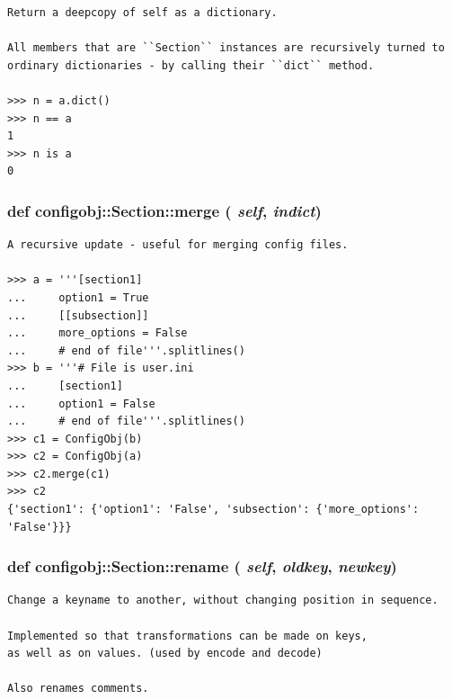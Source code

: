\footnotesize\begin{verbatim}
Return a deepcopy of self as a dictionary.

All members that are ``Section`` instances are recursively turned to
ordinary dictionaries - by calling their ``dict`` method.

>>> n = a.dict()
>>> n == a
1
>>> n is a
0
\end{verbatim}
\normalsize
\subsubsection{\setlength{\rightskip}{0pt plus 5cm}def configobj::Section::merge ( {\em self},  {\em indict})}\label{classconfigobj_1_1Section_c06d7fa9fdd69a29e78fd65a040e5cf2}




\footnotesize\begin{verbatim}
A recursive update - useful for merging config files.

>>> a = '''[section1]
...     option1 = True
...     [[subsection]]
...     more_options = False
...     # end of file'''.splitlines()
>>> b = '''# File is user.ini
...     [section1]
...     option1 = False
...     # end of file'''.splitlines()
>>> c1 = ConfigObj(b)
>>> c2 = ConfigObj(a)
>>> c2.merge(c1)
>>> c2
{'section1': {'option1': 'False', 'subsection': {'more_options': 'False'}}}
\end{verbatim}
\normalsize
\subsubsection{\setlength{\rightskip}{0pt plus 5cm}def configobj::Section::rename ( {\em self},  {\em oldkey},  {\em newkey})}\label{classconfigobj_1_1Section_afc97b84624c87ecfae890958dc9681d}




\footnotesize\begin{verbatim}
Change a keyname to another, without changing position in sequence.

Implemented so that transformations can be made on keys,
as well as on values. (used by encode and decode)

Also renames comments.
\end{verbatim}
\normalsize
